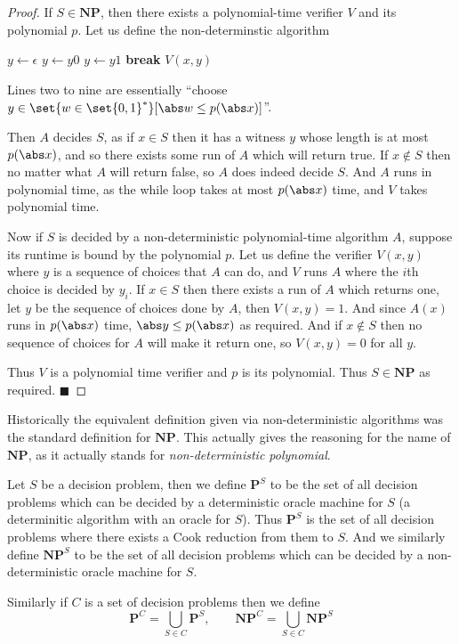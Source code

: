 \documentclass[10pt]{article}
\def\P{\mathbf{P}}
\def\NP{\mathbf{NP}}
\def\qed{%
    \ifmmode%
        \eqno\blacksquare%
    \else%
        \hskip1cm\allowbreak\hbox{}\nobreak\hfill$\blacksquare$%
    \fi%
}
\begin{document}
\begin{proof}

    If $S\in\NP$, then there exists a polynomial-time verifier $V$ and its polynomial $p$.
    Let us define the non-determinstic algorithm

    \algorithm
            \State $y\gets\epsilon$
                \Choose
                    \Choice $y\gets y0$
                    \Choice $y\gets y1$
                    \Choice \textbf{break}
                \EndChoose
            \EndWhile
            \State \Return $V(x,y)$
        \EndFunc
    \ealgorithm

    Lines two to nine are essentially ``choose $y\in\set{w\in\set{0,1}^*}[\abs w\leq p(\abs x)]$''.

    Then $A$ decides $S$, as if $x\in S$ then it has a witness $y$ whose length is at most $p(\abs x)$, and so there exists some run of $A$ which will return true.
    If $x\notin S$ then no matter what $A$ will return false, so $A$ does indeed decide $S$.
    And $A$ runs in polynomial time, as the while loop takes at most $p(\abs x)$ time, and $V$ takes polynomial time.

    Now if $S$ is decided by a non-deterministic polynomial-time algorithm $A$, suppose its runtime is bound by the polynomial $p$.
    Let us define the verifier $V(x,y)$ where $y$ is a sequence of choices that $A$ can do, and $V$ runs $A$ where the $i$th choice is decided by $y_i$.
    If $x\in S$ then there exists a run of $A$ which returns one, let $y$ be the sequence of choices done by $A$, then $V(x,y)=1$.
    And since $A(x)$ runs in $p(\abs x)$ time, $\abs y\leq p(\abs x)$ as required.
    And if $x\notin S$ then no sequence of choices for $A$ will make it return one, so $V(x,y)=0$ for all $y$.

    Thus $V$ is a polynomial time verifier and $p$ is its polynomial.
    Thus $S\in\NP$ as required.
    \qed

\end{proof}

Historically the equivalent definition given via non-deterministic algorithms was the standard definition for $\NP$.
This actually gives the reasoning for the name of $\NP$, as it actually stands for \emph{non-deterministic polynomial}.

\begin{defn*}

    Let $S$ be a decision problem, then we define $\P^S$ to be the set of all decision problems which can be decided by a deterministic oracle machine for $S$ (a determinitic algorithm with an oracle for
    $S$).
    Thus $\P^S$ is the set of all decision problems where there exists a Cook reduction from them to $S$.
    And we similarly define $\NP^S$ to be the set of all decision problems which can be decided by a non-deterministic oracle machine for $S$.

    Similarly if $C$ is a set of decision problems then we define
    \[ \P^C = \bigcup_{S\in C}\P^S,\qquad \NP^C = \bigcup_{S\in C}\NP^S \]

\end{defn*}
\end{document}
